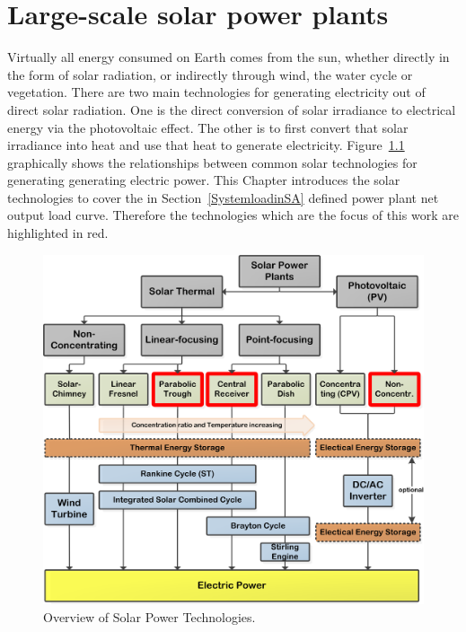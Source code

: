 \chapter{Large-scale solar power plants}
Virtually all energy consumed on Earth comes from the sun, whether directly in the form of solar radiation, or indirectly through wind, the water cycle or vegetation. There are two main technologies for generating electricity out of direct solar radiation. One is the direct conversion of solar irradiance to electrical energy via the photovoltaic effect. The other is to first convert that solar irradiance into heat and use that heat to generate electricity. Figure~\ref{OverviewSTP} graphically shows the relationships between common solar technologies for generating generating electric power. This Chapter introduces the solar technologies to cover the in Section~\ref{SystemloadinSA} defined power plant net output load curve. Therefore the technologies which are the focus of this work are highlighted in red.

\begin{figure}[!h] 
\centering
\includegraphics[width=0.8\linewidth]{FIG/OverviewSTP}
\caption[Overview of Solar Power Technologies.]{Overview of Solar Power Technologies.}\label{OverviewSTP}
\end{figure}



